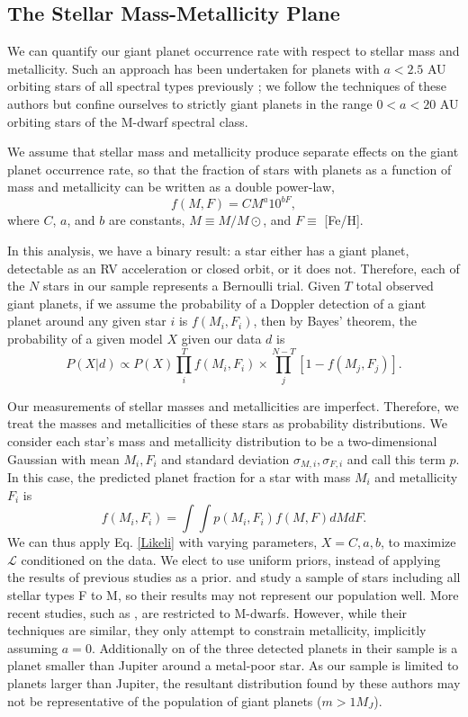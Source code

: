 \subsection{The Stellar Mass-Metallicity Plane}
We can quantify our giant planet occurrence rate with respect to stellar mass and metallicity. Such an approach has been undertaken for planets with $a < 2.5$ AU orbiting stars of all spectral types previously \citep{Johnson10a}; we follow the techniques of these authors but confine ourselves to strictly giant planets in the range $0 < a < 20$ AU orbiting stars of the M-dwarf spectral class.

We assume that stellar mass and metallicity produce separate effects on the giant planet occurrence rate, so that the fraction of stars with planets as a function of mass and metallicity can be written as a double power-law,
\begin{equation}
f(M,F) = CM^a10^{bF},
\end{equation}
where $C$, $a$, and $b$ are constants, $M \equiv M/M\odot$, and $F \equiv$ [Fe/H].

In this analysis, we have a binary result: a star either has a giant planet, detectable as an RV acceleration or closed orbit, or it does not. Therefore, each of the $N$ stars in our sample represents a Bernoulli trial. Given $T$ total observed giant planets, if we assume the probability of a Doppler detection of a giant planet around any given star $i$ is $f(M_i, F_i)$, then by Bayes' theorem, the probability of a given model $X$ given our data $d$ is
\begin{equation}
P(X|d) \propto P(X) \prod_i^T f(M_i,F_i) \times \prod_j^{N-T} [1- f(M_j,F_j)].
\label{Likeli}
\end{equation}

Our measurements of stellar masses and metallicities are imperfect. Therefore, we treat the masses and metallicities of these stars as probability distributions. We consider each star's mass and metallicity distribution to be a two-dimensional Gaussian with mean {$M_i,F_i$} and standard deviation {$\sigma_{M,i},\sigma_{F,i}$ and call this term $p$. In this case, the predicted planet fraction for a star with mass $M_i$ and metallicity $F_i$ is
\begin{equation}
f(M_i,F_i) = \int \int p(M_i, F_i)f(M,F)dM dF.
\end{equation}
We can thus apply Eq. \ref{Likeli} with varying parameters, $X = {C, a, b}$, to maximize $\mathcal{L}$ conditioned on the data. We elect to use uniform priors, instead of applying the results of previous studies as a prior. \citet{Johnson10a} and \citet{Mortier13} study a sample of stars including all stellar types F to M, so their results may not represent our population well. More recent studies, such as \citet{Neves13}, are restricted to M-dwarfs. However, while their techniques are similar, they only attempt to constrain metallicity, implicitly assuming $a=0$. Additionally on of the three detected planets in their sample is a planet smaller than Jupiter around a metal-poor star. As our sample is limited to planets larger than Jupiter, the resultant distribution found by these authors may not be representative of the population of giant planets ($m > 1 M_J$).}

